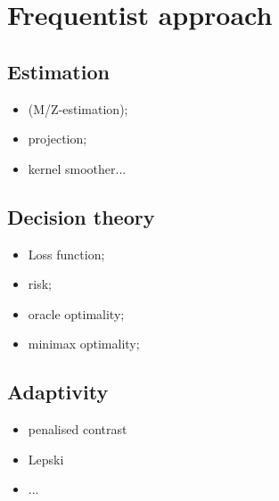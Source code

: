\section{Frequentist approach}\label{1.2}

\subsection{Estimation}\label{1.2.1}
\begin{itemize}
\item (M/Z-estimation);
\item projection;
\item kernel smoother...
\end{itemize}

\subsection{Decision theory}\label{1.2.2}
\begin{itemize}
\item Loss function;
\item risk;
\item oracle optimality;
\item minimax optimality;
\end{itemize}

\subsection{Adaptivity}\label{1.2.3}
\begin{itemize}
\item penalised contrast
\item Lepski
\item ...
\end{itemize}